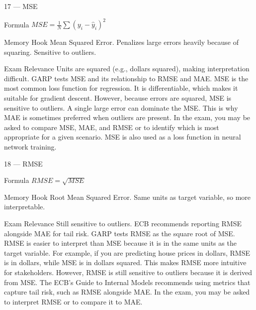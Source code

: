 \documentclass[aspectratio=169,8pt]{beamer}
\begin{document}
	\begin{frame}{17 --- MSE}
		\begin{block}{Formula}
			$MSE = \frac{1}{N}\sum(y_i - \hat{y}_i)^2$
		\end{block}
		\begin{block}{Memory Hook}
			Mean Squared Error. Penalizes large errors heavily because of squaring. Sensitive to outliers.
		\end{block}
		\begin{block}{Exam Relevance}
			Units are squared (e.g., dollars squared), making interpretation difficult. GARP tests MSE and its relationship to RMSE and MAE. MSE is the most common loss function for regression. It is differentiable, which makes it suitable for gradient descent. However, because errors are squared, MSE is sensitive to outliers. A single large error can dominate the MSE. This is why MAE is sometimes preferred when outliers are present. In the exam, you may be asked to compare MSE, MAE, and RMSE or to identify which is most appropriate for a given scenario. MSE is also used as a loss function in neural network training.
		\end{block}
	\end{frame}
	
	\begin{frame}{18 --- RMSE}
		\begin{block}{Formula}
			$RMSE = \sqrt{MSE}$
		\end{block}
		\begin{block}{Memory Hook}
			Root Mean Squared Error. Same units as target variable, so more interpretable.
		\end{block}
		\begin{block}{Exam Relevance}
			Still sensitive to outliers. ECB recommends reporting RMSE alongside MAE for tail risk. GARP tests RMSE as the square root of MSE. RMSE is easier to interpret than MSE because it is in the same units as the target variable. For example, if you are predicting house prices in dollars, RMSE is in dollars, while MSE is in dollars squared. This makes RMSE more intuitive for stakeholders. However, RMSE is still sensitive to outliers because it is derived from MSE. The ECB's Guide to Internal Models recommends using metrics that capture tail risk, such as RMSE alongside MAE. In the exam, you may be asked to interpret RMSE or to compare it to MAE.
		\end{block}
	\end{frame}
	
\end{document}
